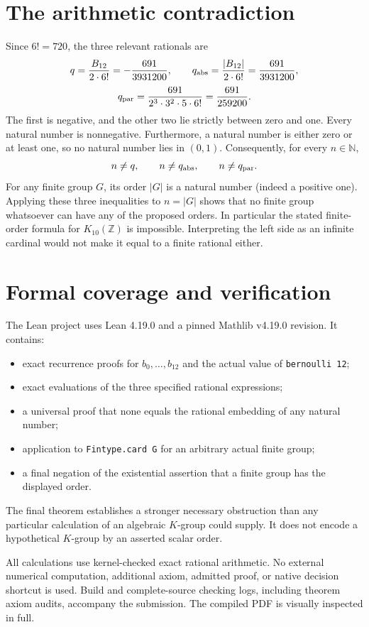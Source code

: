 \documentclass[11pt,a4paper]{article}
\begin{document}
\newpage
\section*{The arithmetic contradiction}
Since $6!=720$, the three relevant rationals are
\[
 q=\frac{B_{12}}{2\cdot6!}=-\frac{691}{3931200},\qquad
 q_{\rm abs}=\frac{|B_{12}|}{2\cdot6!}=\frac{691}{3931200},
\]
\[
 q_{\rm par}=\frac{691}{2^3\cdot3^2\cdot5\cdot6!}
 =\frac{691}{259200}.
\]
The first is negative, and the other two lie strictly between zero and one. Every natural number is nonnegative. Furthermore, a natural number is either zero or at least one, so no natural number lies in $(0,1)$. Consequently, for every $n\in\mathbb N$,
\[
 n\ne q,\qquad n\ne q_{\rm abs},\qquad n\ne q_{\rm par}.
\]
For any finite group $G$, its order $|G|$ is a natural number (indeed a positive one). Applying these three inequalities to $n=|G|$ shows that no finite group whatsoever can have any of the proposed orders. In particular the stated finite-order formula for $K_{10}(\mathbb Z)$ is impossible. Interpreting the left side as an infinite cardinal would not make it equal to a finite rational either.

\section*{Formal coverage and verification}
The Lean project uses Lean 4.19.0 and a pinned Mathlib v4.19.0 revision. It contains:
\begin{itemize}
\item exact recurrence proofs for $b_0,\ldots,b_{12}$ and the actual value of \texttt{bernoulli 12};
\item exact evaluations of the three specified rational expressions;
\item a universal proof that none equals the rational embedding of any natural number;
\item application to \texttt{Fintype.card G} for an arbitrary actual finite group;
\item a final negation of the existential assertion that a finite group has the displayed order.
\end{itemize}
The final theorem establishes a stronger necessary obstruction than any particular calculation of an algebraic $K$-group could supply. It does not encode a hypothetical $K$-group by an asserted scalar order.

All calculations use kernel-checked exact rational arithmetic. No external numerical computation, additional axiom, admitted proof, or native decision shortcut is used. Build and complete-source checking logs, including theorem axiom audits, accompany the submission. The compiled PDF is visually inspected in full.
\end{document}
